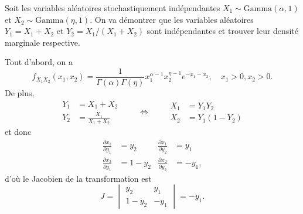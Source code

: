 \begin{exemple}
  \label{ex:transformations:gamma}
  Soit les variables aléatoires stochastiquement indépendantes $X_1 \sim
  \text{Gamma}(\alpha, 1)$ et $X_2 \sim \text{Gamma}(\eta, 1)$. On va
  démontrer que les variables aléatoires $Y_1 = X_1 + X_2$ et $Y_2 =
  X_1/(X_1 + X_2)$ sont indépendantes et trouver leur densité
  marginale respective.

  Tout d'abord, on a
  \begin{displaymath}
    f_{X_1 X_2}(x_1, x_2) = \frac{1}{\Gamma(\alpha) \Gamma(\eta)}
    x_1^{\alpha - 1} x_2^{\eta - 1} e^{-x_1 - x_2}, \quad
    x_1 > 0, x_2 > 0.
  \end{displaymath}
  De plus,
  \begin{displaymath}
    \begin{aligned}
      Y_1 &= X_1 + X_2 \\
      Y_2 &= \frac{X_1}{X_1 + X_2}
    \end{aligned}
    \qquad \Leftrightarrow \qquad
    \begin{aligned}
      X_1 &= Y_1 Y_2 \\
      X_2 &= Y_1(1 - Y_2)
    \end{aligned}
  \end{displaymath}
  et donc
  \begin{align*}
    \frac{\partial x_1}{\partial y_1} &= y_2 &
    \frac{\partial x_1}{\partial y_2} &= y_1 \\
    \frac{\partial x_2}{\partial y_1} &= 1 - y_2 &
    \frac{\partial x_2}{\partial y_2} &= - y_1,
  \end{align*}
  d'où le Jacobien de la transformation est
  \begin{displaymath}
    J =
    \begin{vmatrix}
      y_2 & y_1 \\
      1 - y_2 & -y_1
    \end{vmatrix}
    = - y_1.
  \end{displaymath}


\end{exemple}
